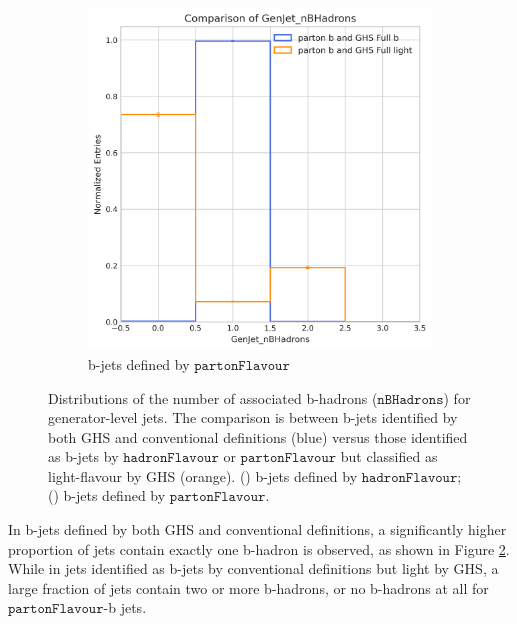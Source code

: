 \documentclass[10pt,twocolumn]{article}
\newcommand*{\parFlav}{\texttt{partonFlavour}}
\newcommand*{\hadFlav}{\texttt{hadronFlavour}}
\begin{document}
\begin{figure}[!htbp]
\begin{subfigure}[t]{0.48\textwidth}
        \includegraphics[width=\textwidth]{images/compare_GenJet_nBHadrons_GHSFull_light_vs_b_filter_partonFlavour_5.png}
        \caption{b-jets defined by $\parFlav$}
        \label{fig:GenJet_nBHad_full_b_parton_b}
    \end{subfigure}
    \caption{Distributions of the number of associated b-hadrons ($\texttt{nBHadrons}$) for generator-level jets. The comparison is between b-jets identified by both GHS and conventional definitions (blue) versus those identified as b-jets by $\hadFlav$ or $\parFlav$ but classified as light-flavour by GHS (orange). () b-jets defined by $\hadFlav$; () b-jets defined by $\parFlav$.}
    \label{fig:GenJet_nBHad}
\end{figure}

In b-jets defined by both GHS and conventional definitions, a significantly higher proportion of jets contain exactly one b-hadron is observed, as shown in Figure \ref{fig:GenJet_nBHad}. While in jets identified as b-jets by conventional definitions but light by GHS, a large fraction of jets contain two or more b-hadrons, or no b-hadrons at all for $\parFlav$-b jets.
\end{document}
